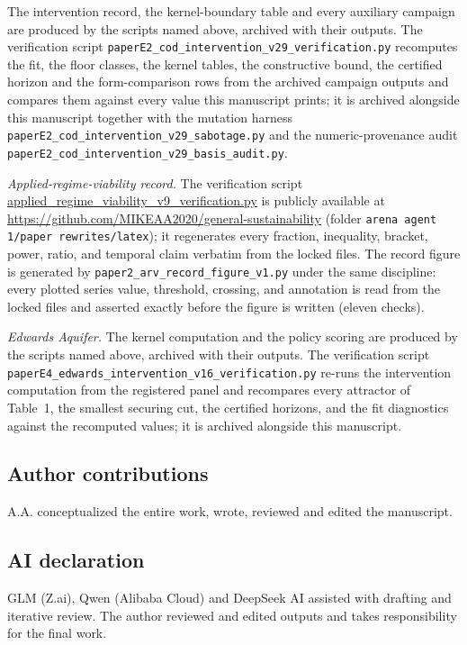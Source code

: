 The intervention record, the kernel-boundary table and every auxiliary
campaign are produced by the scripts named above, archived with their
outputs. The verification script
\texttt{paperE2\_cod\_intervention\_v29\_verification.py} recomputes the
fit, the floor classes, the kernel tables, the constructive bound, the
certified horizon and the form-comparison rows from the archived campaign
outputs and compares them against every value this manuscript prints; it
is archived alongside this manuscript together with the mutation harness
\texttt{paperE2\_cod\_intervention\_v29\_sabotage.py} and the
numeric-provenance audit
\texttt{paperE2\_cod\_intervention\_v29\_basis\_audit.py}.

\emph{Applied-regime-viability record.} The verification script
\url{applied_regime_viability_v9_verification.py}
is publicly available at
\url{https://github.com/MIKEAA2020/general-sustainability} (folder
\texttt{arena agent 1/paper rewrites/latex}); it regenerates every
fraction, inequality, bracket, power, ratio, and temporal claim
verbatim from the locked files. The record figure is generated by
\texttt{paper2\_arv\_record\_figure\_v1.py} under the same discipline:
every plotted series value, threshold, crossing, and annotation is read
from the locked files and asserted exactly before the figure is written
(eleven checks).

\emph{Edwards Aquifer.} The kernel computation and the policy scoring are produced by the scripts
named above, archived with their outputs. The verification script
\texttt{paperE4\_edwards\_intervention\_v16\_verification.py} re-runs
the intervention computation from the registered panel and recompares
every attractor of Table~1, the smallest securing cut, the certified
horizons, and the fit diagnostics against the recomputed values; it is
archived alongside this manuscript.

\subsection*{Author contributions}
A.A. conceptualized the entire work, wrote, reviewed and edited the manuscript.

\subsection*{AI declaration}
GLM (Z.ai), Qwen (Alibaba Cloud) and DeepSeek AI assisted with drafting
and iterative review. The author reviewed and edited outputs and takes
responsibility for the final work.


